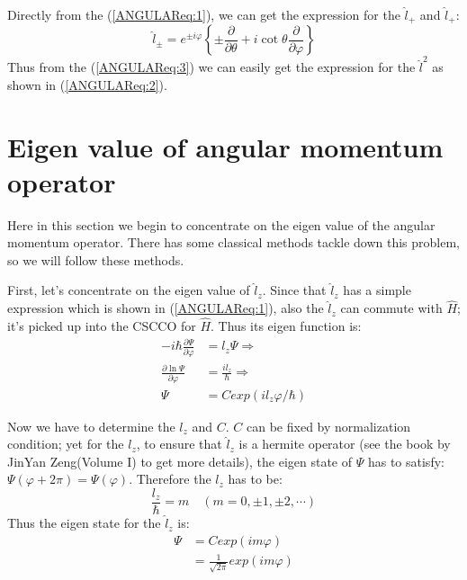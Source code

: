 Directly from the (\ref{ANGULAReq:1}), we can get the expression for
the $\hat{l}_{+}$ and $\hat{l}_{+}$:
\begin{equation}\label{}
\hat{l}_{\pm} = e^{\pm i\varphi}\left\{\pm \frac{\partial}{\partial
\theta} + i\cot\theta \frac{\partial}{\partial\varphi} \right\}
\end{equation}
Thus from the (\ref{ANGULAReq:3}) we can easily get the expression
for the $\hat{l}^{2}$ as shown in (\ref{ANGULAReq:2}).

\section{Eigen value of angular momentum operator}
%
%
Here in this section we begin to concentrate on the eigen value of
the angular momentum operator. There has some classical methods
tackle down this problem, so we will follow these methods.

First, let's concentrate on the eigen value of $\hat{l}_{z}$. Since
that $\hat{l}_{z}$ has a simple expression which is shown in
(\ref{ANGULAReq:1}), also the $\hat{l}_{z}$ can commute with
$\hat{H}$; it's picked up into the CSCCO for $\hat{H}$. Thus its
eigen function is:
\begin{align}\label{}
-i\hbar\frac{\partial \Psi}{\partial\varphi} &= l_{z}\Psi
\Rightarrow
\nonumber \\
\frac{\partial \ln\Psi}{\partial\varphi} &= \frac{il_{z}}{\hbar}
\Rightarrow
\nonumber \\
\Psi &= C exp(il_{z}\varphi/\hbar)
\end{align}

Now we have to determine the $l_{z}$ and $C$. $C$ can be fixed by
normalization condition; yet for the $l_{z}$, to ensure that
$\hat{l}_{z}$ is a hermite operator (see the book by JinYan
Zeng(Volume I)\cite{ZengJinYan} to get more details), the eigen
state of $\Psi$ has to satisfy: $\Psi(\varphi + 2\pi) =
\Psi(\varphi)$. Therefore the $l_{z}$ has to be:
\begin{equation}\label{}
\frac{l_{z}}{\hbar} = m \quad (m=0, \pm 1, \pm 2, \cdots)
\end{equation}
Thus the eigen state for the $\hat{l}_{z}$ is:
\begin{align}\label{ANGULAReq:6}
\Psi &= C exp(im\varphi) \nonumber \\
&= \frac{1}{\sqrt{2 \pi}} exp(im\varphi)
\end{align}

